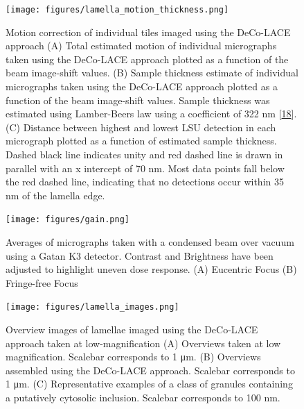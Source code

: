 \documentclass[
]{article}
\newenvironment{fignos:tagged-figure}[1][]{
    \let\oldthefigure\thefigure
    \let\oldtheHfigure\theHfigure
    \renewcommand{\thefigure}{#1}
    \renewcommand{\theHfigure}{#1}
  }{
    \let\thefigure\oldthefigure
    \let\theHfigure\oldtheHfigure
    \addtocounter{figure}{-1}
  }
\begin{document}
\begin{fignos:tagged-figure}

\begin{figure}
\hypertarget{fig:lamella_motion_thickness}{%
\centering
\texttt{[image: figures/lamella\_motion\_thickness.png]}
\caption{Motion correction of individual tiles imaged using the DeCo-LACE
approach (A) Total estimated motion of individual micrographs taken
using the DeCo-LACE approach plotted as a function of the beam
image-shift values. (B) Sample thickness estimate of individual
micrographs taken using the DeCo-LACE approach plotted as a function of
the beam image-shift values. Sample thickness was estimated using
Lamber-Beers law using a coefficient of 322 nm
{[}\protect\hyperlink{ref-17IP4Lhz1}{18}{]}. (C) Distance between highest and
lowest LSU detection in each micrograph plotted as a function of
estimated sample thickness. Dashed black line indicates unity and red
dashed line is drawn in parallel with an x intercept of 70 nm. Most data
points fall below the red dashed line, indicating that no detections
occur within 35 nm of the lamella
edge.}\label{fig:lamella_motion_thickness}
}
\end{figure}

\end{fignos:tagged-figure}

\begin{fignos:tagged-figure}

\begin{figure}
\hypertarget{fig:gain}{%
\centering
\texttt{[image: figures/gain.png]}
\caption{Averages of micrographs taken with a condensed beam over vacuum using
a Gatan K3 detector. Contrast and Brightness have been adjusted to
highlight uneven dose response. (A) Eucentric Focus (B) Fringe-free
Focus}\label{fig:gain}
}
\end{figure}

\end{fignos:tagged-figure}

\begin{fignos:tagged-figure}

\begin{figure}
\hypertarget{fig:lamella_images}{%
\centering
\texttt{[image: figures/lamella\_images.png]}
\caption{Overview images of lamellae imaged using the DeCo-LACE approach taken
at low-magnification (A) Overviews taken at low magnification. Scalebar
corresponds to 1 μm. (B) Overviews assembled using the DeCo-LACE
approach. Scalebar corresponds to 1 μm. (C) Representative examples of a
class of granules containing a putatively cytosolic inclusion. Scalebar
corresponds to 100 nm.}\label{fig:lamella_images}
}
\end{figure}

\end{fignos:tagged-figure}
\end{document}
